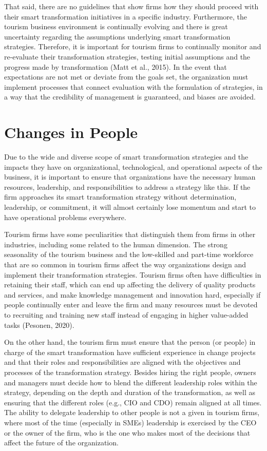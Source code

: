 \documentclass[
  letterpaper,
  DIV=11,
  numbers=noendperiod]{scrreprt}
\begin{document}
That said, there are no guidelines that show firms how they should
proceed with their smart transformation initiatives in a specific
industry. Furthermore, the tourism business environment is continually
evolving and there is great uncertainty regarding the assumptions
underlying smart transformation strategies. Therefore, it is important
for tourism firms to continually monitor and re-evaluate their
transformation strategies, testing initial assumptions and the progress
made by transformation (Matt et al., 2015). In the event that
expectations are not met or deviate from the goals set, the organization
must implement processes that connect evaluation with the formulation of
strategies, in a way that the credibility of management is guaranteed,
and biases are avoided.

\hypertarget{changes-in-people}{%
\section{Changes in People}\label{changes-in-people}}

Due to the wide and diverse scope of smart transformation strategies and
the impacts they have on organizational, technological, and operational
aspects of the business, it is important to ensure that organizations
have the necessary human resources, leadership, and responsibilities to
address a strategy like this. If the firm approaches its smart
transformation strategy without determination, leadership, or
commitment, it will almost certainly lose momentum and start to have
operational problems everywhere.

Tourism firms have some peculiarities that distinguish them from firms
in other industries, including some related to the human dimension. The
strong seasonality of the tourism business and the low-skilled and
part-time workforce that are so common in tourism firms affect the way
organizations design and implement their transformation strategies.
Tourism firms often have difficulties in retaining their staff, which
can end up affecting the delivery of quality products and services, and
make knowledge management and innovation hard, especially if people
continually enter and leave the firm and many resources must be devoted
to recruiting and training new staff instead of engaging in higher
value-added tasks (Pesonen, 2020).

On the other hand, the tourism firm must ensure that the person (or
people) in charge of the smart transformation have sufficient experience
in change projects and that their roles and responsibilities are aligned
with the objectives and processes of the transformation strategy.
Besides hiring the right people, owners and managers must decide how to
blend the different leadership roles within the strategy, depending on
the depth and duration of the transformation, as well as ensuring that
the different roles (e.g., CIO and CDO) remain aligned at all times. The
ability to delegate leadership to other people is not a given in tourism
firms, where most of the time (especially in SMEs) leadership is
exercised by the CEO or the owner of the firm, who is the one who makes
most of the decisions that affect the future of the organization.
\end{document}
